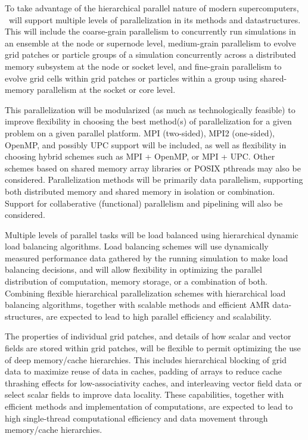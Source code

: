 \documentclass{article}
\begin{document}
     To take advantage of the
   hierarchical parallel nature of modern supercomputers, \cello\ will
   support multiple levels of parallelization in its methods and
   datastructures.  This will include the coarse-grain parallelism to
   concurrently run simulations in an ensemble at the node or
   supernode level, medium-grain parallelism to evolve grid patches or
   particle groups of a simulation concurrently across a distributed
   memory subsystem at the node or socket level, and fine-grain parallelism to
   evolve grid cells within grid patches or particles within a group
   using shared-memory parallelism at the socket or core level.

     This parallelization will be
   modularized (as much as technologically feasible) to improve
   flexibility in choosing the best method(s) of parallelization for a
   given problem on a given parallel platform.  MPI (two-sided), MPI2
   (one-sided), OpenMP, and possibly UPC support will be included, as
   well as flexibility in choosing hybrid schemes such as MPI +
   OpenMP, or MPI + UPC.  Other schemes based on shared memory array
   libraries or POSIX pthreads may also be considered.
   Parallelization methods will be primarily data parallelism,
   supporting both distributed memory and shared memory in isolation
   or combination.  Support for collaberative (functional) parallelism
   and pipelining will also be considered.


     Multiple levels of parallel tasks
   will be load balanced using hierarchical dynamic load balancing
   algorithms.  Load balancing schemes will use dynamically measured
   performance data gathered by the running simulation to make load
   balancing decisions, and will allow flexibility in optimizing the
   parallel distribution of computation, memory storage, or a
   combination of both.  Combining flexible hierarchical
   parallelization schemes with hierarchical load balancing
   algorithms, together with scalable methods and efficient AMR
   data-structures, are expected to lead to high parallel efficiency
   and scalability.


%
   The properties of individual grid patches, and details of how
   scalar and vector fields are stored within grid patches, will be
   flexible to permit optimizing the use of deep memory/cache
   hierarchies.  This includes hierarchical blocking of grid data to
   maximize reuse of data in caches, padding of arrays to reduce cache
   thrashing effects for low-associativity caches, and interleaving
   vector field data or select scalar fields to improve data locality.
   These capabilities, together with efficient methods and
   implementation of computations, are expected to lead to high
   single-thread computational efficiency and data movement through
   memory/cache hierarchies.
\end{document}
